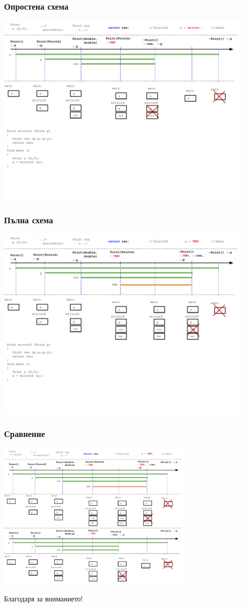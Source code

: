 \documentclass{beamer}
\begin{document}
\begin{frame}[fragile]
\frametitle{Опростена схема}
\includegraphics[width=12.5cm]{images/lc_return_simple}
\end{frame}

\begin{frame}[fragile]
\frametitle{Пълна схема}
\includegraphics[width=12.5cm]{images/lc_return_full}
\end{frame}

\begin{frame}[fragile]
\frametitle{Сравнение}
\includegraphics[width=9.5cm]{images/lc_return_dual}
\end{frame}


\begin{frame}
\centerline{Благодаря за вниманието!}
\end{frame}
\end{document}
